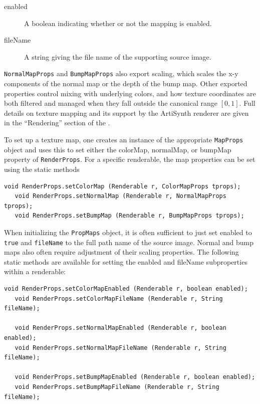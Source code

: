 \begin{description}

\item[enabled]\mbox{}

A boolean indicating whether or not the mapping is enabled.

\item[fileName]\mbox{}

A string giving the file name of the supporting source image.

\end{description}

{\tt NormalMapProps} and {\tt BumpMapProps} also export {\sf scaling},
which scales the x-y components of the normal map or the depth of the
bump map. Other exported properties control mixing with underlying
colors, and how texture coordinates are both filtered and managed when
they fall outside the canonical range $[0,1]$.  Full details on
texture mapping and its support by the ArtiSynth renderer are given in
the ``Rendering'' section of the 
.

To set up a texture map, one creates an instance of the appropriate
{\tt MapProps} object and uses this to set either the {\sf colorMap},
{\sf normalMap}, or {\sf bumpMap} property of {\tt RenderProps}.  
For a specific renderable, the map properties can be set
using the static methods
%
\begin{lstlisting}[]
   void RenderProps.setColorMap (Renderable r, ColorMapProps tprops);
   void RenderProps.setNormalMap (Renderable r, NormalMapProps tprops);
   void RenderProps.setBumpMap (Renderable r, BumpMapProps tprops);
\end{lstlisting}
%
When
initializing the {\tt PropMaps} object, it is often sufficient to just
set {\sf enabled} to {\tt true} and {\tt fileName} to the full path
name of the source image.  Normal and bump maps also often require
adjustment of their {\sf scaling} properties.  The following static
methods are available for setting the {\sf enabled} and
{\sf fileName} subproperties within a renderable:
%
\begin{lstlisting}[]
   void RenderProps.setColorMapEnabled (Renderable r, boolean enabled);
   void RenderProps.setColorMapFileName (Renderable r, String fileName);

   void RenderProps.setNormalMapEnabled (Renderable r, boolean enabled);
   void RenderProps.setNormalMapFileName (Renderable r, String fileName);

   void RenderProps.setBumpMapEnabled (Renderable r, boolean enabled);
   void RenderProps.setBumpMapFileName (Renderable r, String fileName);
\end{lstlisting}
%

